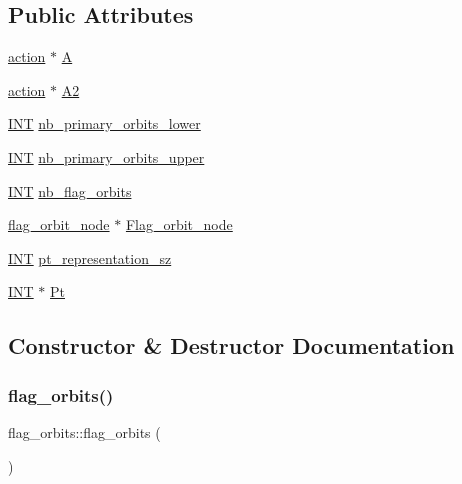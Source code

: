 \subsection*{Public Attributes}
\begin{DoxyCompactItemize}
\item 
\mbox{\hyperlink{classaction}{action}} $\ast$ \mbox{\hyperlink{classflag__orbits_a5b0add6f87d948d0fa33f413f362efc1}{A}}
\item 
\mbox{\hyperlink{classaction}{action}} $\ast$ \mbox{\hyperlink{classflag__orbits_ad9dd12f445b975a5743c5017ce6cc601}{A2}}
\item 
\mbox{\hyperlink{galois_8h_a09fddde158a3a20bd2dcadb609de11dc}{I\+NT}} \mbox{\hyperlink{classflag__orbits_a63e0d819bc1b23a68bf6716bb338c42c}{nb\+\_\+primary\+\_\+orbits\+\_\+lower}}
\item 
\mbox{\hyperlink{galois_8h_a09fddde158a3a20bd2dcadb609de11dc}{I\+NT}} \mbox{\hyperlink{classflag__orbits_af7b31d67c2c8c1e6a7219f1db84fbf32}{nb\+\_\+primary\+\_\+orbits\+\_\+upper}}
\item 
\mbox{\hyperlink{galois_8h_a09fddde158a3a20bd2dcadb609de11dc}{I\+NT}} \mbox{\hyperlink{classflag__orbits_ad7a5b645f75c41cf7aa6418594a7f060}{nb\+\_\+flag\+\_\+orbits}}
\item 
\mbox{\hyperlink{classflag__orbit__node}{flag\+\_\+orbit\+\_\+node}} $\ast$ \mbox{\hyperlink{classflag__orbits_a6cd6373ac55b03b3a0d1d7f07a277bea}{Flag\+\_\+orbit\+\_\+node}}
\item 
\mbox{\hyperlink{galois_8h_a09fddde158a3a20bd2dcadb609de11dc}{I\+NT}} \mbox{\hyperlink{classflag__orbits_a65897e01ca3bc947cf74addf2bec043b}{pt\+\_\+representation\+\_\+sz}}
\item 
\mbox{\hyperlink{galois_8h_a09fddde158a3a20bd2dcadb609de11dc}{I\+NT}} $\ast$ \mbox{\hyperlink{classflag__orbits_a3bd05e9553fa2b4a23828cdfb542779b}{Pt}}
\end{DoxyCompactItemize}


\subsection{Constructor \& Destructor Documentation}
\mbox{\label{classflag__orbits_a466ce692272f2faf2507cd355c1232ad}} 
\subsubsection{\texorpdfstring{flag\+\_\+orbits()}{flag\_orbits()}}
{\footnotesize\ttfamily flag\+\_\+orbits\+::flag\+\_\+orbits (\begin{DoxyParamCaption}{ }\end{DoxyParamCaption})}

